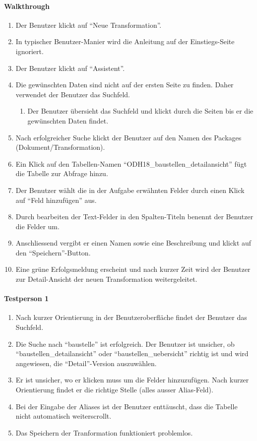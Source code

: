\paragraph{Walkthrough}
\begin{enumerate}
\item Der Benutzer klickt auf ``Neue Transformation''.
\item In typischer Benutzer-Manier wird die Anleitung auf der Einstiegs-Seite ignoriert.
\item Der Benutzer klickt auf ``Assistent''.
\item \label{ui-test-assist-begin} Die gewünschten Daten sind nicht auf der ersten Seite zu finden. Daher verwendet der Benutzer das Suchfeld.
  \begin{enumerate}[label=\labelenumi\alph*.]
  \item Der Benutzer übersieht das Suchfeld und klickt durch die Seiten bis er die gewünschten Daten findet.
  \end{enumerate}
\item Nach erfolgreicher Suche klickt der Benutzer auf den Namen des Packages (Dokument/Transformation).
\item Ein Klick auf den Tabellen-Namen ``ODH18\_baustellen\_detailansicht'' fügt die Tabelle zur Abfrage hinzu.
\item Der Benutzer wählt die in der Aufgabe erwähnten Felder durch einen Klick auf ``Feld hinzufügen'' aus.
\item \label{ui-test-assist-end}Durch bearbeiten der Text-Felder in den Spalten-Titeln benennt der Benutzer die Felder um.
\item Anschliessend vergibt er einen Namen sowie eine Beschreibung und klickt auf den ``Speichern''-Button.
\item Eine grüne Erfolgsmeldung erscheint und nach kurzer Zeit wird der Benutzer zur Detail-Ansicht der neuen Transformation weitergeleitet.
\end{enumerate}

\paragraph{Testperson 1}
\begin{enumerate}
\item Nach kurzer Orientierung in der Benutzeroberfläche findet der Benutzer das Suchfeld.
\item Die Suche nach ``baustelle'' ist erfolgreich. Der Benutzer ist unsicher, ob ``baustellen\_detailansicht'' oder ``baustellen\_uebersicht'' richtig ist und wird angewiesen, die ``Detail''-Version auszuwählen.
\item Er ist unsicher, wo er klicken muss um die Felder hinzuzufügen. Nach kurzer Orientierung findet er die richtige Stelle (alles ausser Alias-Feld).
\item Bei der Eingabe der Aliases ist der Benutzer enttäuscht, dass die Tabelle nicht automatisch weiterscrollt. 
\item Das Speichern der Tranformation funktioniert problemlos.
\end{enumerate}

